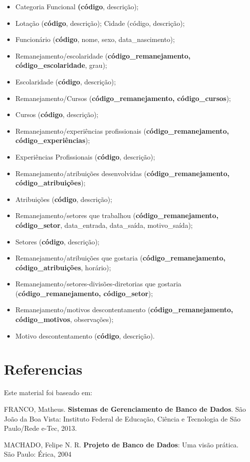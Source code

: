 \documentclass{article}
\begin{document}
\begin{itemize}
    \item Categoria Funcional \textbf{(código}, descrição);
    \item Lotação (\textbf{código}, descrição); Cidade (código, descrição);
    \item Funcionário (\textbf{código}, nome, sexo, data\_nascimento);
    \item Remanejamento/escolaridade (\textbf{código\_remanejamento, código\_escolaridade}, grau);
    \item Escolaridade (\textbf{código}, descrição);
    \item Remanejamento/Cursos (\textbf{código\_remanejamento, código\_cursos});
    \item Cursos (\textbf{código}, descrição);
    \item Remanejamento/experiências profissionais (\textbf{código\_remanejamento, código\_experiências});
    \item Experiências Profissionais (\textbf{código}, descrição);
    \item Remanejamento/atribuições desenvolvidas (\textbf{código\_remanejamento, código\_atribuições});
    \item Atribuições (\textbf{código}, descrição);
    \item Remanejamento/setores que trabalhou (\textbf{código\_remanejamento, código\_setor}, data\_entrada, data\_saída, motivo\_saída);
    \item Setores (\textbf{código}, descrição);
    \item Remanejamento/atribuições que gostaria (\textbf{código\_remanejamento, código\_atribuições}, horário);
    \item Remanejamento/setores-divisões-diretorias que gostaria (\textbf{código\_remanejamento, código\_setor});
    \item Remanejamento/motivos descontentamento (\textbf{código\_remanejamento, código\_motivos}, observações);
    \item Motivo descontentamento (\textbf{código}, descrição).
\end{itemize}


\section{Referencias }
Este material foi baseado em:

FRANCO, Matheus. \textbf{Sistemas de Gerenciamento de Banco de Dados}. São João da Boa Vista: Instituto Federal de Educação, Ciência e Tecnologia de São Paulo/Rede e-Tec, 2013.


MACHADO, Felipe N. R. \textbf{Projeto de Banco de Dados}: Uma visão prática. São Paulo: Érica, 2004
\end{document}
